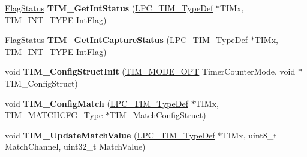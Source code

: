 \begin{DoxyCompactItemize}
\item 
\hypertarget{group___t_i_m___public___functions_ga130c0afcee8fd3246f790e0f1de35ad2}{\hyperlink{group___l_p_c___types___public___types_ga89136caac2e14c55151f527ac02daaff}{\-Flag\-Status} {\bfseries \-T\-I\-M\-\_\-\-Get\-Int\-Status} (\hyperlink{struct_l_p_c___t_i_m___type_def}{\-L\-P\-C\-\_\-\-T\-I\-M\-\_\-\-Type\-Def} $\ast$\-T\-I\-Mx, \hyperlink{group___t_i_m___public___types_ga2fd69882c6757b73b5728fd321d3104c}{\-T\-I\-M\-\_\-\-I\-N\-T\-\_\-\-T\-Y\-P\-E} \-Int\-Flag)}\label{group___t_i_m___public___functions_ga130c0afcee8fd3246f790e0f1de35ad2}

\item 
\hypertarget{group___t_i_m___public___functions_gaadcf829a99c3c35f71aad42e4295de7c}{\hyperlink{group___l_p_c___types___public___types_ga89136caac2e14c55151f527ac02daaff}{\-Flag\-Status} {\bfseries \-T\-I\-M\-\_\-\-Get\-Int\-Capture\-Status} (\hyperlink{struct_l_p_c___t_i_m___type_def}{\-L\-P\-C\-\_\-\-T\-I\-M\-\_\-\-Type\-Def} $\ast$\-T\-I\-Mx, \hyperlink{group___t_i_m___public___types_ga2fd69882c6757b73b5728fd321d3104c}{\-T\-I\-M\-\_\-\-I\-N\-T\-\_\-\-T\-Y\-P\-E} \-Int\-Flag)}\label{group___t_i_m___public___functions_gaadcf829a99c3c35f71aad42e4295de7c}

\item 
\hypertarget{group___t_i_m___public___functions_ga99653f81968537946e6a95f3383a28ed}{void {\bfseries \-T\-I\-M\-\_\-\-Config\-Struct\-Init} (\hyperlink{group___t_i_m___public___types_gacb2a94f8fe0bdfc2435033d97569dc2b}{\-T\-I\-M\-\_\-\-M\-O\-D\-E\-\_\-\-O\-P\-T} \-Timer\-Counter\-Mode, void $\ast$\-T\-I\-M\-\_\-\-Config\-Struct)}\label{group___t_i_m___public___functions_ga99653f81968537946e6a95f3383a28ed}

\item 
\hypertarget{group___t_i_m___public___functions_gad246501b2030a7d83b2374765007810f}{void {\bfseries \-T\-I\-M\-\_\-\-Config\-Match} (\hyperlink{struct_l_p_c___t_i_m___type_def}{\-L\-P\-C\-\_\-\-T\-I\-M\-\_\-\-Type\-Def} $\ast$\-T\-I\-Mx, \hyperlink{struct_t_i_m___m_a_t_c_h_c_f_g___type}{\-T\-I\-M\-\_\-\-M\-A\-T\-C\-H\-C\-F\-G\-\_\-\-Type} $\ast$\-T\-I\-M\-\_\-\-Match\-Config\-Struct)}\label{group___t_i_m___public___functions_gad246501b2030a7d83b2374765007810f}

\item 
\hypertarget{group___t_i_m___public___functions_ga090bf392ee047e3a6502d2dd8a9241e6}{void {\bfseries \-T\-I\-M\-\_\-\-Update\-Match\-Value} (\hyperlink{struct_l_p_c___t_i_m___type_def}{\-L\-P\-C\-\_\-\-T\-I\-M\-\_\-\-Type\-Def} $\ast$\-T\-I\-Mx, uint8\-\_\-t \-Match\-Channel, uint32\-\_\-t \-Match\-Value)}\label{group___t_i_m___public___functions_ga090bf392ee047e3a6502d2dd8a9241e6}


\end{DoxyCompactItemize}
